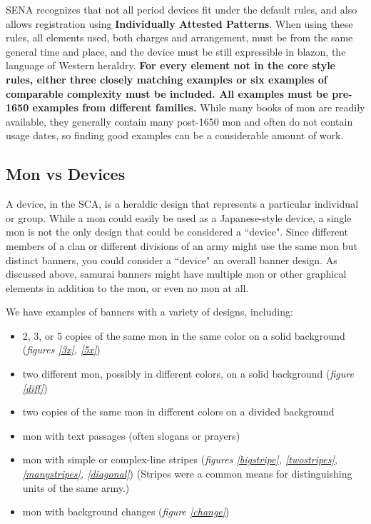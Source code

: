 \documentclass{article}
\newcounter{fig}
\begin{document}
  SENA recognizes that not all period devices fit under the default
  rules, and also allows registration using \textbf{Individually Attested
  Patterns}. When using these rules, all elements used, both charges
  and arrangement, must be from the same general time and place, and
  the device must be still expressible in blazon, the language of
  Western heraldry.  \textbf{For every element not in the core style rules,
  either three closely matching examples or six examples of comparable
  complexity must be included.  All examples must be pre-1650 examples
  from different families.}  While many books of mon are readily
  available, they generally contain many post-1650 mon and often do
  not contain usage dates, so finding good examples can be a
  considerable amount of work.

\subsection{Mon vs Devices}

  A device, in the SCA, is a heraldic design that represents a
  particular individual or group.  While a mon could easily be used as
  a Japanese-style device, a single mon is not the only design that
  could be considered a ``device".  Since different members of a clan
  or different divisions of an army might use the same mon but
  distinct banners, you could consider a ``device" an overall banner
  design.  As discussed above, samurai banners might have multiple mon
  or other graphical elements in addition to the mon, or even no mon
  at all.

  We have examples of banners with a variety of designs, including:
  
\begin{itemize}
\item 2, 3, or 5
  copies of the same mon in the same color on a solid background
  (\emph{figures \ref{3x}, \ref{5x}})
\item two different mon, possibly in
  different colors, on a solid background (\emph{figure \ref{diff}})
\item two copies of the same mon in different colors on a divided
  background
\item mon with text passages (often slogans or prayers)
\item mon with simple or complex-line stripes (\emph{figures \ref{bigstripe}, \ref{twostripes},
  \ref{manystripes}, \ref{diagonal}}) (Stripes
  were a common means for distinguishing units of the same
  army.)
\item mon with background changes (\emph{figure \ref{change}})
\end{itemize}
\end{document}
